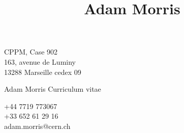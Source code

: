 \documentclass[contbibnum,titleabove]{simplecv}
\title{Adam Morris}
\begin{document}
	\fontfamily{\typeface}\selectfont
	\noindent\begin{minipage}{0.33\textwidth}
	CPPM, Case 902\\163, avenue de Luminy\\13288 Marseille cedex 09
	\end{minipage}
	\noindent\begin{minipage}{0.33\textwidth}
	\centering
	{\Huge Adam Morris}
	{\large Curriculum vitae}
	\end{minipage}
	\noindent\begin{minipage}{0.33\textwidth}
	\raggedleft
	+44 7719 773067\\+33 652 61 29 16\\{adam.morris@cern.ch}
	\end{minipage}
	
	
	
	
	
	
	
	
	
	
%	
\end{document}

